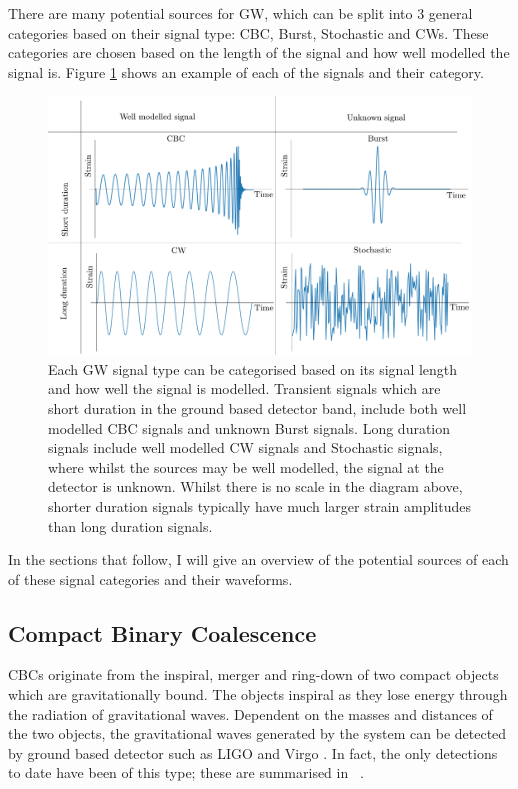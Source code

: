 There are many potential sources for \gls{GW}, which can be split into 3
general categories based on their signal type: \gls{CBC}, Burst, Stochastic and
\glspl{CW}.  These categories are chosen based on the length of the signal and
how well modelled the signal is.  Figure \ref{intro:sources:signaltypes} shows
an example of each of the signals and their category.
%
\begin{figure}[h]
    \centering
    \includegraphics[width=\textwidth]{C1_intro/sources_types.pdf}
    \caption[GW signal types]{Each \gls{GW} signal type can be categorised
based on its signal length and how well the signal is modelled. Transient
signals which are short duration in the ground based detector band, include
both well modelled \gls{CBC} signals and unknown Burst signals. Long duration
signals include well modelled \gls{CW} signals and Stochastic
signals, where whilst the sources may be well modelled, the signal at the detector is unknown.
Whilst there is no scale in the diagram above, shorter duration signals typically have much larger strain amplitudes than long duration signals.}
\label{intro:sources:signaltypes}
\end{figure}

In the sections that follow, I will give an overview of the potential sources
of each of these signal categories and their waveforms.


\subsection{\label{sources:transient:cbc}Compact Binary Coalescence}

\glspl{CBC} originate from the inspiral, merger and ring-down of
two compact objects which are gravitationally bound.  The objects inspiral as
they lose energy through the radiation of
gravitational waves.  Dependent on the masses and distances of the two objects,
the gravitational waves generated by the system can be detected by ground based
detector such as \gls{LIGO} \citep{aasi2015AdvancedLIGO} and Virgo
\citep{acernese2015AdvancedVirgo}.  In fact, the only detections to date have
been of this type; these are summarised in
\citep{ligoscientificcollaborationandvirgocollaboration2019GWTC1GravitationalWave}~.

